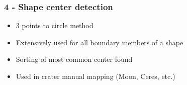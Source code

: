 \documentclass[aspectratio=169]{beamer}
\begin{document}
{
\begin{frame}[plain]
\end{frame}}


\begin{frame}
  \frametitle{4 - Shape center detection}
\begin{center}
\begin{itemize}
 \item 3 points to circle method 
 \item Extensively used for all boundary members of a shape
 \item Sorting of most common center found 
 \item Used in crater manual mapping (Moon, Ceres, etc.)
\end{itemize}
\end{center}
\end{frame}

\end{document}
